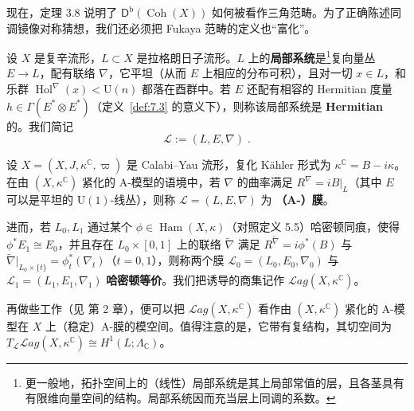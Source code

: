 现在，定理 3.8 说明了 $\mathsf D^{\mathrm b}(\operatorname{Coh}(X))$ 如何被看作三角范畴。为了正确陈述同调镜像对称猜想，我们还必须把 Fukaya 范畴的定义也“富化”。

\begin{Def}\label{def:7.23}
设 $X$ 是复辛流形，$L\subset X$ 是拉格朗日子流形。$L$ 上的\textbf{局部系统}是\footnote{更一般地，拓扑空间上的（线性）局部系统是其上局部常值的层，且各茎具有有限维向量空间的结构。局部系统因而充当层上同调的系数。}复向量丛 $E\to L$，配有联络 $\nabla$，它平坦（从而 $E$ 上相应的分布可积），且对一切 $x\in L$，和乐群 $\operatorname{Hol}^\nabla(x)<\mathrm U(n)$ 都落在酉群中。若 $E$ 还配有相容的 Hermitian 度量 $h\in\Gamma(E^*\otimes E^*)$（定义~\ref{def:7.3} 的意义下），则称该局部系统是 \textbf{Hermitian} 的。我们简记
\[
\mathcal L:=(L,E,\nabla)\;.
\]
\end{Def}

\begin{Rem}\label{rem:7.24}
设 $X=(X,J,\kappa^{\mathbb C},\varpi)$ 是 Calabi–Yau 流形，复化 Kähler 形式为 $\kappa^{\mathbb C}=B-i\kappa$。在由 $(X,\kappa^{\mathbb C})$ 紧化的 A-模型的语境中，若 $\nabla$ 的曲率满足 $R^\nabla=iB|_L$（其中 $E$ 可以是平坦的 $\mathrm U(1)$-线丛），则称 $\mathcal L=(L,E,\nabla)$ 为 \textbf{（A-）膜}。

进而，若 $L_0,L_1$ 通过某个 $\phi\in\operatorname{Ham}(X,\kappa)$（对照定义 5.5）哈密顿同痕，使得 $\phi^*E_1\cong E_0$，并且存在 $L_0\times[0,1]$ 上的联络 $\tilde\nabla$ 满足 $R^{\tilde\nabla}=i\phi^*(B)$ 与 $\tilde\nabla|_{L_0\times\{t\}}=\phi_t^*(\nabla_t)$（$t=0,1$），则称两个膜 $\mathcal L_0=(L_0,E_0,\nabla_0)$ 与 $\mathcal L_1=(L_1,E_1,\nabla_1)$ \textbf{哈密顿等价}。我们把诱导的商集记作 $\mathcal Lag(X,\kappa^{\mathbb C})$。

再做些工作（见 \cite{Fuk02a} 第 2 章），便可以把 $\mathcal Lag(X,\kappa^{\mathbb C})$ 看作由 $(X,\kappa^{\mathbb C})$ 紧化的 A-模型在 $X$ 上（稳定）A-膜的模空间。值得注意的是，它带有复结构，其切空间为 $T_{\mathcal L}\mathcal Lag(X,\kappa^{\mathbb C})\cong H^1(L;\Lambda_{\mathbb C})$。
\end{Rem}

